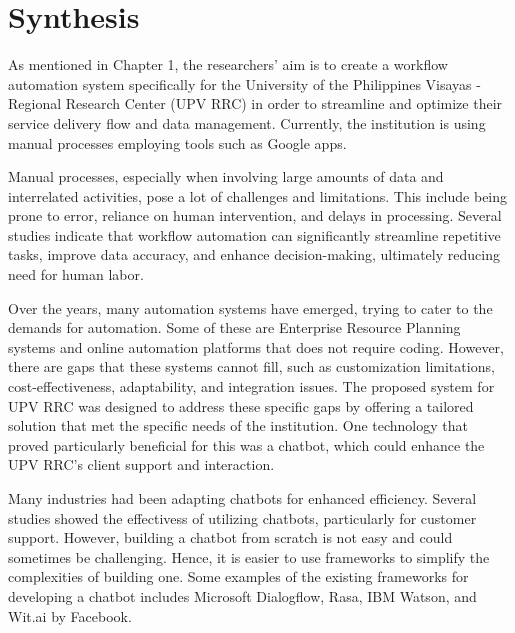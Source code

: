 \section{Synthesis}

As mentioned in Chapter 1, the researchers' aim is to create a workflow automation system specifically for the University of the Philippines Visayas - Regional Research Center (UPV RRC) in order to streamline and optimize their service delivery flow and data management. Currently, the institution is using manual processes employing tools such as Google apps.

Manual processes, especially when involving large amounts of data and interrelated activities, pose a lot of challenges and limitations. This include being prone to error, reliance on human intervention, and delays in processing. Several studies indicate that workflow automation can significantly streamline repetitive tasks, improve data accuracy, and enhance decision-making, ultimately reducing need for human labor. 

Over the years, many automation systems have emerged, trying to cater to the demands for automation. Some of these are Enterprise Resource Planning systems and online automation platforms that does not require coding. However, there are gaps that these systems cannot fill, such as customization limitations, cost-effectiveness, adaptability, and integration issues. The proposed system for UPV RRC was designed to address these specific gaps by offering a tailored solution that met the specific needs of the institution. One technology that proved particularly beneficial for this was a chatbot, which could enhance the UPV RRC’s client support and interaction.

Many industries had been adapting chatbots for enhanced efficiency. Several studies showed the effectivess of utilizing chatbots, particularly for customer support. However, building a chatbot from scratch is not easy and could sometimes be challenging. Hence, it is easier to use frameworks to simplify the complexities of building one. Some examples of the existing frameworks for developing a chatbot includes Microsoft Dialogflow, Rasa, IBM Watson, and Wit.ai by Facebook.